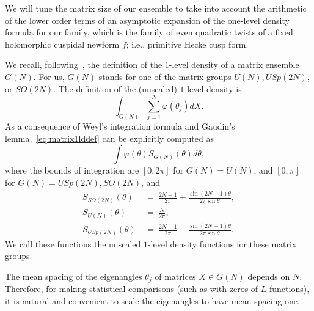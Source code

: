 \documentclass[11pt,reqno]{amsart} \usepackage{fullpage}
\newcommand\be{\begin{equation}}
\newcommand\ee{\end{equation}}
\numberwithin{equation}{section}
\begin{document}
We will tune the matrix size of our ensemble to take into account the arithmetic of the
lower order terms of an asymptotic expansion of the one-level density formula for our
family, which is the family of even quadratic twists of a fixed holomorphic cuspidal
newform $f$; i.e., primitive Hecke cusp form.

We recall, following~\cite{conreymatrix},
the definition of the $1$-level density of a matrix ensemble $G(N)$.
For us, $G(N)$ stands for one of the matrix groups
$U(N), USp(2N)$, or $SO(2N)$. The definition of the (unscaled) $1$-level density is
\be\label{eq:matrix1lddef} \int_{G(N)}\sum_{j=1}^N \varphi(\theta_j)dX.\ee
As a consequence of Weyl's integration formula and Gaudin's 
lemma,~\eqref{eq:matrix1lddef} can be explicitly computed as
\be\int\varphi(\theta)S_{G(N)}(\theta)d\theta,\ee
where the bounds of integration are $[0,2\pi]$ for $G(N)=U(N)$, and $[0,\pi]$ for
$G(N)=USp(2N),SO(2N)$, and
\begin{align}
  S_{SO(2N)}(\theta)&\ =\ \frac{2N-1}{2\pi}+\frac{\sin(2N-1)\theta}{2\pi\sin\theta}, \\
  S_{U(N)}(\theta)&\ =\ \frac N{2\pi}, \\
  S_{USp(2N)}(\theta)&\ =\ \frac{2N+1}{2\pi}-\frac{\sin(2N+1)\theta}{2\pi\sin\theta}.
\end{align}
We call these functions the unscaled $1$-level density functions for these matrix groups.

The mean spacing of the eigenangles $\theta_j$ of matrices $X\in G(N)$ depends on $N$.
Therefore, for making statistical comparisons (such as with zeros of $L$-functions), it
is natural and convenient to scale the eigenangles to have mean spacing one.
\end{document}
